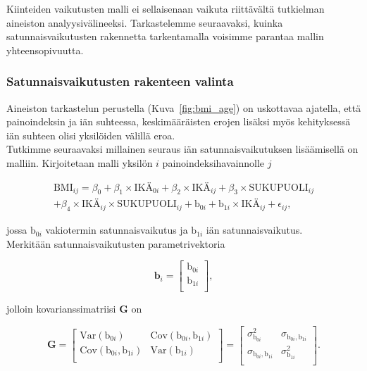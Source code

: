 \documentclass[finnish]{docopts}
\begin{document}
Kiinteiden vaikutusten malli ei sellaisenaan vaikuta riittävältä tutkielman aineiston analyysivälineeksi. Tarkastelemme seuraavaksi, kuinka satunnaisvaikutusten rakennetta tarkentamalla voisimme parantaa mallin yhteensopivuutta.\\

\subsubsection{Satunnaisvaikutusten rakenteen valinta}
\label{ssb:satunnaisrakenneval}

Aineiston tarkastelun perustella (Kuva~\ref{fig:bmi_age}) on uskottavaa ajatella, että painoindeksin ja iän suhteessa, keskimääräisten erojen lisäksi myös kehityksessä iän suhteen olisi yksilöiden välillä eroa. \\

Tutkimme seuraavaksi millainen seuraus iän satunnaisvaikutuksen lisäämisellä on malliin. Kirjoitetaan malli yksilön $i$ painoindeksihavainnolle $j$

\begin{equation}
\begin{split}
 \text{BMI}_{ij} = \beta_0 + \beta_1 \times \text{IKÄ}_{0i} + \beta_2 \times \text{IKÄ}_{ij} + \beta_3 \times \text{SUKUPUOLI}_{ij} \\
+ \beta_4 \times \text{IKÄ}_{ij} \times \text{SUKUPUOLI}_{ij} + \text{b}_{0i} + \text{b}_{1i} \times \text{IKÄ}_{ij} + \epsilon_{ij},
\label{eq:lme2}
\end{split}
\end{equation}

jossa $\text{b}_{0i}$ vakiotermin satunnaisvaikutus ja $\text{b}_{1i}$ iän satunnaisvaikutus.\\ 

Merkitään satunnaisvaikutusten parametrivektoria

$$
\bm{b}_i =
\begin{bmatrix}
\text{b}_{0i} \\
\text{b}_{1i} \\
\end{bmatrix},
$$

jolloin kovarianssimatriisi $\bm{G}$ on

$$
\bm{G} =
\begin{bmatrix}
\text{Var}(\text{b}_{0i}) & \text{Cov}(\text{b}_{0i}, \text{b}_{1i}) \\
\text{Cov}(\text{b}_{0i}, \text{b}_{1i}) & \text{Var}(\text{b}_{1i}) \\
\end{bmatrix} =
\begin{bmatrix}
\sigma^2_{\text{b}_{0i}} & \sigma_{\text{b}_{0i}, \text{b}_{1i}} \\
\sigma_{\text{b}_{0i}, \text{b}_{1i}} & \sigma^2_{\text{b}_{1i}} \\
\end{bmatrix}.
$$
\end{document}
